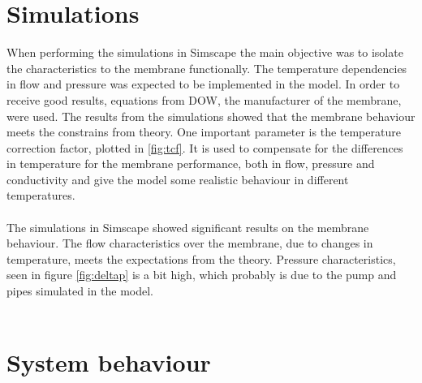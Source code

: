 \section{Simulations}
When performing the simulations in Simscape the main objective was to isolate the characteristics to the membrane functionally. The temperature dependencies in flow and pressure was expected to be implemented in the model. In order to receive good results, equations from DOW, the manufacturer of the membrane, were used. The results from the simulations showed that the membrane behaviour meets the constrains from theory. One important parameter is the temperature correction factor, plotted in \ref{fig:tcf}. It is used to compensate for the differences in temperature for the membrane performance, both in flow, pressure and conductivity and give the model some realistic behaviour in different temperatures. \\
\\
The simulations in Simscape showed significant results on the membrane behaviour. The flow characteristics over the membrane, due to changes in temperature, meets the expectations from the theory. Pressure characteristics, seen in figure \ref{fig:deltap} is a bit high, which probably is due to the pump and pipes simulated in the model. \\
\\


\section{System behaviour} 



